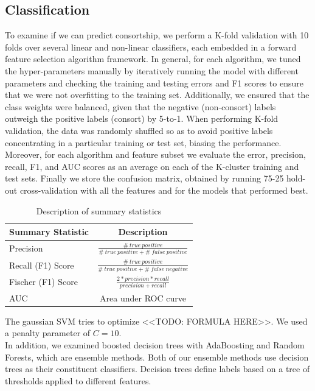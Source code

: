 \documentclass[twoside,twocolumn,paper=letter,fontsize=11pt]{article}
\begin{document}
\subsection{Classification}
To examine if we can predict consortship, we perform a K-fold validation with 10
folds over several linear and non-linear classifiers, each embedded in a forward
feature selection algorithm framework. In general, for each algorithm, we tuned
the hyper-parameters manually by iteratively running the model with different
parameters and checking the training and testing errors and F1 scores to ensure
that we were not overfitting to the training set.  Additionally, we ensured that
the class weights were balanced, given that the negative (non-consort) labels
outweigh the positive labels (consort) by 5-to-1. When performing K-fold
validation, the data was randomly shuffled so as to avoid positive labels
concentrating in a particular training or test set, biasing the performance.
Moreover, for each algorithm and feature subset we evaluate the error,
precision, recall, F1, and AUC scores as an average on
each of the K-cluster training and test sets.  Finally we store the confusion
matrix, obtained by running 75-25 hold-out cross-validation with all the
features and for the models that performed best.
\begin{table}[h]
  \centering
  \begin{tabular}{|l|c|}
    \hline
    Summary Statistic & Description \\
    \hline
    Precision&
    $\frac{\#\ true\ positive}{\#\ true\ positive + \#\ false\ positive}$\\
    \hline
    Recall (F1) Score &
    $\frac{\#\ true\ positive}{\#\ true\ positive + \#\ false\ negative}$\\
    \hline
    Fischer (F1) Score &
    $\frac{2* precision* recall}{{precision}+{recall}}$\\
    \hline
    AUC &
    Area under ROC curve \\
    \hline
  \end{tabular}
  \caption{Description of summary statistics}
  \label{tbl:sum_stats}
\end{table}

 The gaussian SVM
tries to optimize <<TODO: FORMULA HERE>>. We used a penalty parameter of
$C=10$.\\

In addition, we examined boosted decision trees with AdaBoosting and Random
Forests, which are ensemble methods. Both of our ensemble methods use decision
trees as their constituent classifiers. Decision trees define labels based on a
tree of thresholds applied to different features.\\
\end{document}
